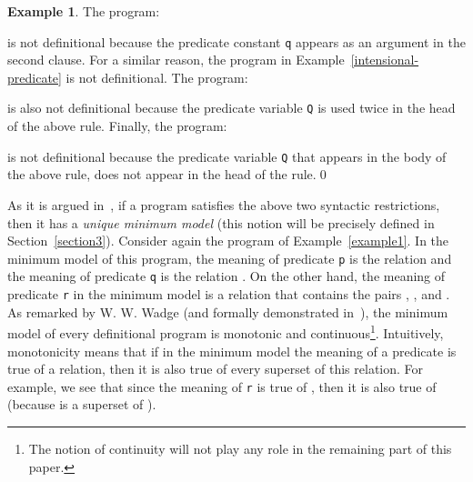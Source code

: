 \documentclass[submission,copyright]{eptcs}
\theoremstyle{definition}
\newtheorem{example}{Example}
\begin{document}
\begin{example}\label{example2}
The program:

is not definitional because the predicate constant {\tt q} appears as an
argument in the second clause. For a similar reason, the program in
Example~\ref{intensional-predicate} is not definitional. The program:

is also not definitional because the predicate variable {\tt Q} is used twice in the
head of the above rule. Finally, the program:

is not definitional because the predicate variable {\tt Q} that appears in the
body of the above rule, does not appear in the head of the rule.\qed
\end{example}
As it is argued in~\cite{Wa91a}, if a program satisfies the above two syntactic restrictions,
then it has a {\em unique minimum model} (this notion will be precisely defined in
Section~\ref{section3}). Consider again the program of Example~\ref{example1}. In the minimum
model of this program, the meaning of predicate {\tt p} is the relation  and
the meaning of predicate {\tt q} is the relation . On the other hand, the meaning
of predicate {\tt r} in the minimum model is a relation that contains the pairs ,
,  and .
As remarked by W. W. Wadge (and formally demonstrated in~\cite{KRW05,CharalambidisHRW13}), the minimum
model of every definitional program is monotonic and continuous\footnote{The notion of continuity
will not play any role in the remaining part of this paper.}. Intuitively, monotonicity means
that if in the minimum model the meaning of a predicate is true of a relation, then it is also
true of every superset of this relation. For example, we see that since the meaning of {\tt r}
is true of  , then it is also true of 
(because  is a superset of ).
\end{document}
